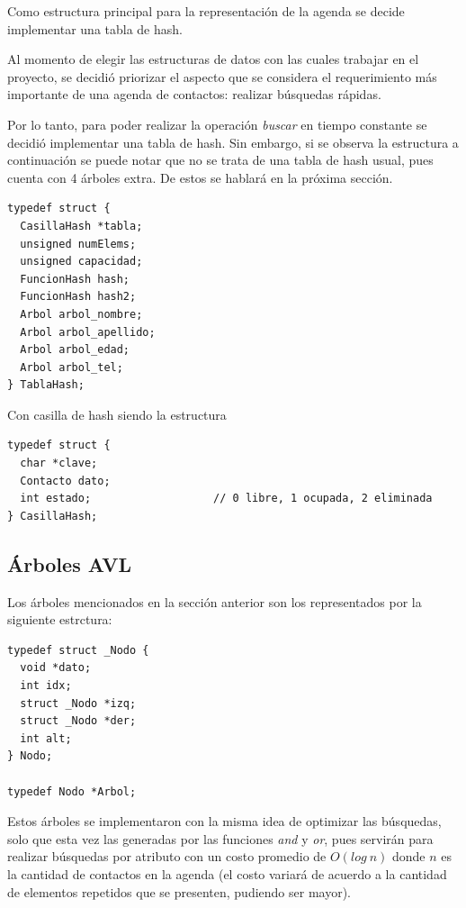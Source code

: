 \documentclass[11pt]{article}
\begin{document}
Como estructura principal para la representaci\'on de la agenda se decide implementar una tabla de hash.

Al momento de elegir las estructuras de datos con las cuales trabajar en el proyecto, se decidi\'o priorizar el aspecto que se considera 
el requerimiento m\'as importante de una agenda de contactos: realizar b\'usquedas r\'apidas. 

Por lo tanto, para poder realizar la operaci\'on \emph{buscar} en tiempo constante se decidi\'o implementar una tabla de hash. 
Sin embargo, si se observa la estructura a continuaci\'on se puede notar que no se trata de una tabla de hash usual, pues 
cuenta con 4 \'arboles extra. De estos se hablar\'a en la pr\'oxima secci\'on.

\begin{lstlisting}[style = CStyle]
typedef struct {
  CasillaHash *tabla;
  unsigned numElems;
  unsigned capacidad;
  FuncionHash hash;
  FuncionHash hash2;
  Arbol arbol_nombre;
  Arbol arbol_apellido;
  Arbol arbol_edad;
  Arbol arbol_tel;
} TablaHash;
\end{lstlisting}

Con casilla de hash siendo la estructura 

\begin{lstlisting}[style = CStyle]
  typedef struct {
  char *clave;
  Contacto dato;
  int estado;                   // 0 libre, 1 ocupada, 2 eliminada
} CasillaHash;
\end{lstlisting}

\vspace{1cm}

\subsection{Árboles AVL}

Los \'arboles mencionados en la secci\'on anterior son los representados por la siguiente estrctura: 

\begin{lstlisting}[style = CStyle]
typedef struct _Nodo {
  void *dato;
  int idx;
  struct _Nodo *izq;
  struct _Nodo *der;
  int alt;
} Nodo;

typedef Nodo *Arbol;
\end{lstlisting}

Estos \'arboles se implementaron con la misma idea de optimizar las b\'usquedas, solo que esta vez las generadas por las funciones \emph{and} y \emph{or}, pues servir\'an para realizar
b\'usquedas por atributo con un costo promedio de $O(log\ n)$ donde $n$ es la cantidad de contactos en la agenda (el costo variar\'a de acuerdo a la cantidad de elementos repetidos que se presenten, pudiendo ser mayor).
\end{document}
